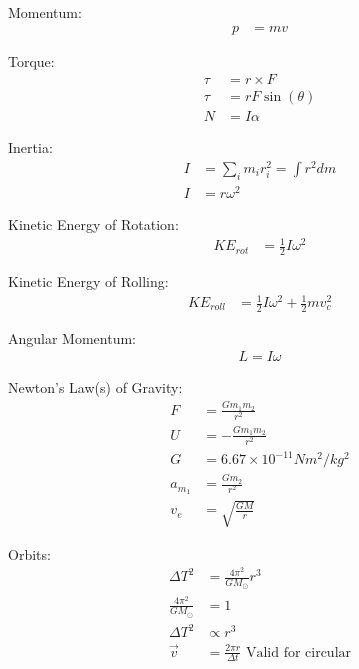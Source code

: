 \documentclass[10pt, letterpaper]{book}
\begin{document}
\begin{multicols*}{2}
        Momentum:
        \begin{align}
            p    & = mv
        \end{align}

        Torque:
        \begin{align}
            \tau & = r \times F     \\
            \tau & = rF\sin(\theta) \\
            N    & = I\alpha        
        \end{align}

        Inertia:
        \begin{align}
            I   & = \sum_{i}m_{i}r_{i}^{2} = \int r^{2}dm   \\
            I   & = r\omega^{2}
        \end{align}

        Kinetic Energy of Rotation:
        \begin{align}
            KE_{rot}  & = \frac{1}{2}I\omega^{2}
        \end{align}

        Kinetic Energy of Rolling:
        \begin{align}
            KE_{roll} & = \frac{1}{2}I\omega^{2} + \frac{1}{2}mv_{c}^{2}    
        \end{align}

        Angular Momentum:
        \begin{align}
            L = I\omega
        \end{align}

        Newton's Law(s) of Gravity:
        \begin{align}
            F   & = \frac{Gm_{1}m_{2}}{r^{2}}           \\
            U   & = -\frac{Gm_{1}m_{2}}{r^{2}}          \\
            G   & = 6.67 \times 10^{-11}Nm^{2}/kg^{2}   \\
            a_{m_{1}}   & = \frac{Gm_{2}}{r^{2}}        \\
            v_{e}   & = \sqrt{\frac{GM}{r}}
        \end{align}

        Orbits:
        \begin{align}
            \Delta T^{2}   & = \frac{4\pi^{2}}{GM_{\odot}}r^{3} \\
            \frac{4\pi^{2}}{GM_{\odot}} & = 1                   \\
            \Delta T^{2} & \propto r^{3}                        \\
            \vec{v} & = \frac{2\pi r}{\Delta t} 
            \text{ Valid for circular}                    
        \end{align}


\end{multicols*}
\end{document}
